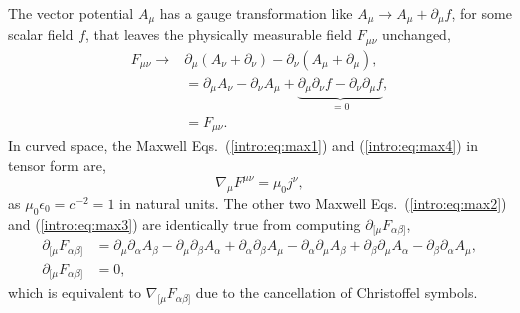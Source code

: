 The vector potential $A_\mu$ has a gauge transformation like $A_\mu \rightarrow A_\mu + \partial_\mu f$, for some scalar field $f$, that leaves the physically measurable field $F_{\mu\nu}$ unchanged,
\begin{align}
F_{\mu\nu} \rightarrow &\partial_{\mu} (A_\nu + \partial_\nu) -  \partial_{\nu} (A_\mu + \partial_\mu) ,\\
&= \partial_{\mu} A_\nu - \partial_{\nu} A_\mu + \underbrace{\partial_\mu\partial_\nu f - \partial_\nu \partial_\mu f}_{=0} , \\
&= F_{\mu\nu}.
\end{align}
In curved space, the Maxwell Eqs.~(\ref{intro:eq:max1}) and (\ref{intro:eq:max4}) in tensor form are,
\begin{equation}
\nabla_\mu F^{\mu\nu} = \mu_0 j^\nu,
\end{equation}
as $\mu_0 \epsilon_0 = c^{-2} = 1$ in natural units. The other two Maxwell Eqs.~(\ref{intro:eq:max2}) and (\ref{intro:eq:max3}) are identically true from computing $\partial_{[\mu} F_{\alpha\beta]}$,
\begin{align}
\partial_{[\mu} F_{\alpha\beta]} &= \partial_\mu\partial_\alpha A_\beta - \partial_\mu\partial_\beta A_\alpha
+\partial_\alpha\partial_\beta A_\mu - \partial_\alpha\partial_\mu A_\beta
+\partial_\beta\partial_\mu A_\alpha - \partial_\beta\partial_\alpha A_\mu ,\\\partial_{[\mu} F_{\alpha\beta]} &=0,
\end{align}
which is equivalent to $\nabla_{[\mu}F_{\alpha\beta]}$ due to the cancellation of Christoffel symbols.



